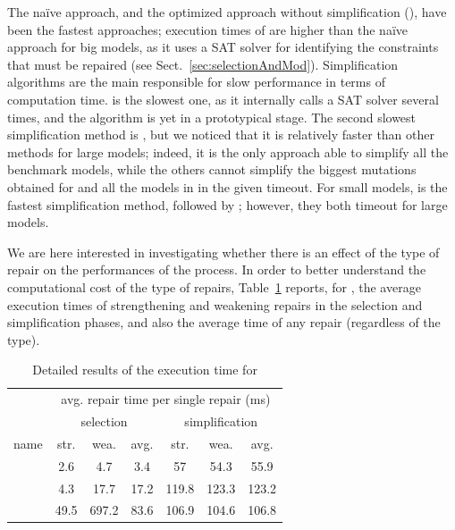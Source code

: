 \begin{tikzborder}{\cite{Gargantini16:validation}}
\begin{tikzborder}{\cite{gargantini_combinatorial_2017}}
\begin{tikzborder}{\cite{garn2019}}
\begin{tikzborder}{\cite{arcaini2019achieving}}
\begin{tikzborder}{\cite{arcaini2019varivolution}}
		The na{\"i}ve approach, and the optimized approach without simplification (\onlySelection), have been the fastest approaches; execution times of \onlySelection are higher than the na{\"i}ve approach for big models, as it uses a SAT solver for identifying the constraints that must be repaired (see Sect.~\ref{sec:selectionAndMod}). Simplification algorithms are the main responsible for slow performance in terms of computation time. \atgt is the slowest one, as it internally calls a SAT solver several times, and the algorithm is yet in a prototypical stage. The second slowest simplification method is \espresso, but we noticed that it is relatively faster than other methods for large models; indeed, it is the only approach able to simplify all the benchmark models, while the others cannot simplify the biggest mutations obtained for \tightVnc and all the models in \benchReal in the given timeout. For small models, \jbool is the fastest simplification method, followed by \qm; however, they both timeout for large models.
		
		
		
		We are here interested in investigating whether there is an effect of the type of repair on the performances of the process. In order to better understand the computational cost of the type of repairs, Table~\ref{tab:experimentc} reports, for \benchReal, the average execution times of strengthening and weakening repairs in the selection and simplification phases, and also the average time of any repair (regardless of the type).\be
		\begin{table}[!hbt]
			\centering%
			\caption{Detailed results of the execution time for \benchReal}
			\label{tab:experimentc}
			\begin{tabular}{c|ccc|ccc}
				\toprule
				& \multicolumn{6}{c}{avg. repair time per single repair (ms)}\\
				& \multicolumn{3}{c|}{selection} & \multicolumn{3}{c}{simplification}\\
				name & str. & wea. & avg. & str. & wea. & avg.\\
				\midrule
				\rhiscom & 2.6 & 4.7 & 3.4 & 57 & 54.3 & 55.9\\
				\erpSpl & 4.3 & 17.7 & 17.2 & 119.8 & 123.3 & 123.2\\
				\windows & 49.5 & 697.2 & 83.6 & 106.9 & 104.6 & 106.8\\
				\bottomrule
			\end{tabular}
		\end{table}
		

\end{tikzborder}
\end{tikzborder}
\end{tikzborder}
\end{tikzborder}
\end{tikzborder}

